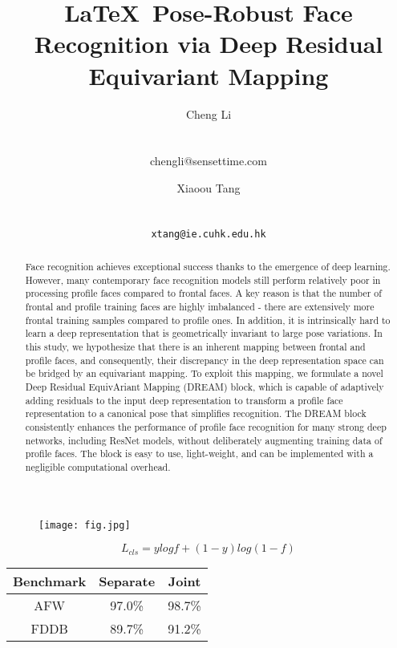 \documentclass{article}
\begin{document}
  
\title{\LaTeX\ Pose-Robust Face Recognition via Deep Residual Equivariant Mapping}
\author{ Cheng Li\\
\\
\\
{chengli@sensettime.com}
\and
Xiaoou Tang\\
\\
\\
{\tt\small xtang@ie.cuhk.edu.hk}
}

\maketitle
\begin{abstract}
Face recognition achieves exceptional success thanks to the emergence of deep learning. However, many contemporary face recognition models still perform relatively poor in processing profile faces compared to frontal faces. A key reason is that the number of frontal and profile training faces are highly imbalanced - there are extensively more frontal training samples compared to profile ones. In addition, it is intrinsically hard to learn a deep representation that is geometrically invariant to large pose variations. In this study, we hypothesize that there is an inherent mapping between frontal and profile faces, and consequently, their discrepancy in the deep representation space can be bridged by an equivariant mapping. To exploit this mapping, we formulate a novel Deep Residual EquivAriant Mapping (DREAM) block, which is capable of adaptively adding residuals to the input deep representation to transform a profile face representation to a canonical pose that simplifies recognition. The DREAM block consistently enhances the performance of profile face recognition for many strong deep networks, including ResNet models, without deliberately augmenting training data of profile faces. The block is easy to use, light-weight, and can be implemented with a negligible computational overhead.
\end{abstract}


\begin{figure}
\begin{center}
   \texttt{[image: fig.jpg]}
\end{center}

\label{fig:long}
\label{fig:onecol}
\end{figure}

\begin{equation}
L_{cls} = ylogf + (1-y)log(1-f)
\end{equation}



\begin{table}
\begin{center}
\begin{tabular}{ccc}
\hline
Benchmark & Separate & Joint\\
\hline
AFW & 97.0\% & 98.7\% \\
\hline
FDDB & 89.7\% & 91.2\% \\
\hline
\end{tabular}
\end{center}
\end{table}
\end{document}
